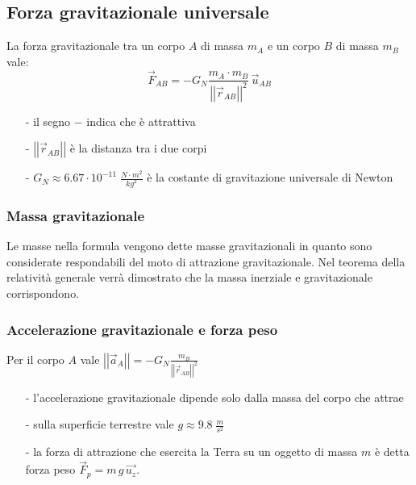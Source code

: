 \documentclass[a4paper]{article}
\newcommand\vmod[1]{\left|\left|{#1}\right|\right|}
\begin{document}
\newpage


\subsection{Forza gravitazionale universale}
La forza gravitazionale tra un corpo \(A\) di massa \(m_A\) e un corpo \(B\) di massa \(m_B\) vale:
\[\vec{F}_{AB} = - G_N \frac{m_A \cdot m_B}{\vmod{\vec{r}_{AB}}^2} \, \vec{u}_{AB}\]

\begin{itemize}[topsep=3pt, itemsep=0pt]
	\item[-] il segno \(-\) indica che è attrattiva
	\item[-] \(\vmod{\vec{r}_{AB}}\) è la distanza tra i due corpi
	\item[-] \(\displaystyle G_N \approx 6.67 \cdot 10^{-11} \; \frac{N \cdot m^2}{kg^2}\) è la costante di gravitazione universale di Newton
\end{itemize}

\subsubsection*{Massa gravitazionale}
Le masse nella formula vengono dette masse gravitazionali in quanto sono considerate respondabili del moto di attrazione gravitazionale.
Nel teorema della relatività generale verrà dimostrato che la massa inerziale e gravitazionale corrispondono.

\subsubsection*{Accelerazione gravitazionale e forza peso}
Per il corpo \(A\) vale \(\displaystyle \vmod{\vec{a}_A} = -G_N \frac{m_B}{\vmod{\vec{r}_{AB}}^2}\)

\begin{itemize}[topsep=3pt, itemsep=0pt]
	\item[-] l'accelerazione gravitazionale dipende solo dalla massa del corpo che attrae
	\item[-] sulla superficie terrestre vale \(\displaystyle g \approx 9.8 \; \frac{m}{s^2}\)
	\item[-] la forza di attrazione che esercita la Terra su un oggetto di massa \(m\) è detta forza peso \(\vec{F}_p = m \, g \, \vec{u_z}\).
\end{itemize}
\end{document}
